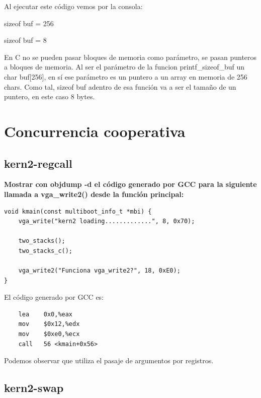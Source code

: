 \documentclass[a4paper]{article}
\begin{document}
Al ejecutar este código vemos por la consola:

	sizeof buf = 256

	sizeof buf = 8

En C no se pueden pasar bloques de memoria como parámetro, se pasan punteros a bloques de memoria. Al ser el parámetro de la funcion printf\_sizeof\_buf un char buf[256], en sí ese parámetro es un puntero a un array en memoria de 256 chars. Como tal, sizeof buf adentro de esa función va a ser el tamaño de un puntero, en este caso 8 bytes.

\section{Concurrencia cooperativa}

\subsection{kern2-regcall}

\textbf{Mostrar con objdump -d el código generado por GCC para la siguiente llamada a vga\_write2() desde la función principal:}
\begin{lstlisting}
void kmain(const multiboot_info_t *mbi) {
    vga_write("kern2 loading.............", 8, 0x70);

    two_stacks();
    two_stacks_c();

    vga_write2("Funciona vga_write2?", 18, 0xE0);
}
\end{lstlisting}
El código generado por GCC es:
\begin{lstlisting}
	lea    0x0,%eax
	mov    $0x12,%edx
	mov    $0xe0,%ecx
	call   56 <kmain+0x56>
\end{lstlisting}
Podemos observar que utiliza el pasaje de argumentos por registros.

\subsection{kern2-swap}
\end{document}
